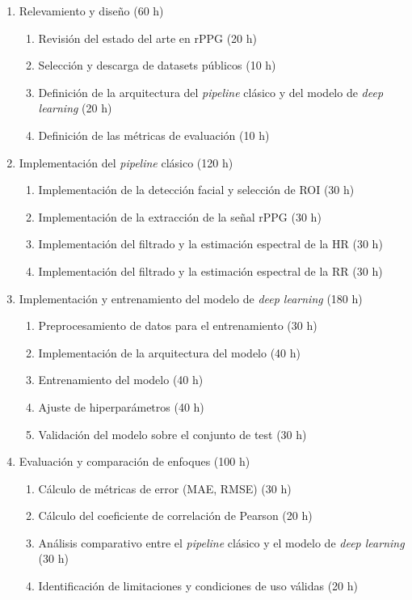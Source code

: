 \documentclass[
11pt, %
]{charter}
\begin{document}
	\begin{enumerate}
		\item Relevamiento y diseño (60 h)
		\begin{enumerate}
			\item Revisión del estado del arte en rPPG (20 h)
			\item Selección y descarga de datasets públicos (10 h)
			\item Definición de la arquitectura del \textit{pipeline} clásico y del modelo de \textit{deep learning} (20 h)
			\item Definición de las métricas de evaluación (10 h)
		\end{enumerate}
		\item Implementación del \textit{pipeline} clásico (120 h)
		\begin{enumerate}
			\item Implementación de la detección facial y selección de ROI (30 h)
			\item Implementación de la extracción de la señal rPPG (30 h)
			\item Implementación del filtrado y la estimación espectral de la HR (30 h)
			\item Implementación del filtrado y la estimación espectral de la RR (30 h)
		\end{enumerate}
		\item Implementación y entrenamiento del modelo de \textit{deep learning} (180 h)
		\begin{enumerate}
			\item Preprocesamiento de datos para el entrenamiento (30 h)
			\item Implementación de la arquitectura del modelo (40 h)
			\item Entrenamiento del modelo (40 h)
			\item Ajuste de hiperparámetros (40 h)
			\item Validación del modelo sobre el conjunto de test (30 h)
		\end{enumerate}
		\item Evaluación y comparación de enfoques (100 h)
		\begin{enumerate}
			\item Cálculo de métricas de error (MAE, RMSE) (30 h)
			\item Cálculo del coeficiente de correlación de Pearson (20 h)
			\item Análisis comparativo entre el \textit{pipeline} clásico y el modelo de \textit{deep learning} (30 h)
			\item Identificación de limitaciones y condiciones de uso válidas (20 h)

\end{enumerate}
\end{enumerate}
\end{document}
